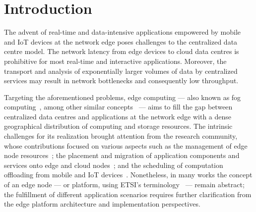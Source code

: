 \section{Introduction}

The advent of real-time and data-intensive applications empowered by mobile and IoT devices 
at the network edge 
poses challenges to the centralized data centre model. The network latency from edge devices to cloud data centres is prohibitive for most real-time and interactive applications.
Moreover, the transport and analysis of exponentially larger volumes of data by centralized services may result in network bottlenecks and consequently low throughput. 

Targeting the aforementioned problems, edge computing --- also known as fog computing~\cite{Bonomi:2012}, among other similar concepts~\cite{Satyanarayanan:2009,Taleb:2013,ETSI:MEC:2016:03} --- aims to fill the gap between centralized data centres and applications at the network edge with a dense geographical distribution of computing and storage resources. The intrinsic challenges for its realization brought attention from the research community, whose contributions focused on various aspects such as the management of edge node resources~\cite{N.Wang:2017}; the placement and migration of application components and services onto edge and cloud nodes~\cite{Wang:2015a,Wang:2017,Machen:2018}; and the scheduling of computation offloading from mobile and IoT devices~\cite{Liu:2016, OrsiniBL16}. Nonetheless, in many works the concept of an edge node --- or platform, using ETSI's terminology~\cite{ETSI:MEC:2016:03} --- remain abstract; the fulfillment of different application scenarios requires further clarification from the edge platform architecture and implementation perspectives.










